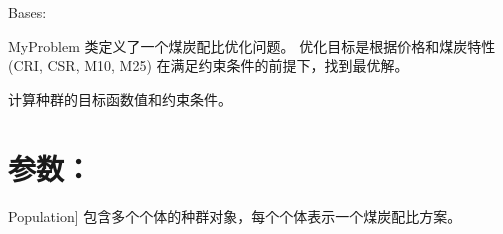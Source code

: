 \documentclass[a4paper,12pt,english]{sphinxmanual}
\begin{document}
\begin{fulllineitems}
\label{\detokenize{api/genetic_algorithm_geatpy1:genetic_algorithm_geatpy1.MyProblem}}
\pysigstartsignatures
{}
\pysigstopsignatures
\sphinxAtStartPar
Bases: 

\sphinxAtStartPar
MyProblem 类定义了一个煤炭配比优化问题。
优化目标是根据价格和煤炭特性 (CRI, CSR, M10, M25) 在满足约束条件的前提下，找到最优解。

\begin{fulllineitems}
\label{\detokenize{api/genetic_algorithm_geatpy1:genetic_algorithm_geatpy1.MyProblem.aimFunc}}
\pysigstartsignatures
{}
\pysigstopsignatures
\sphinxAtStartPar
计算种群的目标函数值和约束条件。


\section{参数：}
\label{\detokenize{api/genetic_algorithm_geatpy1:id1}}\begin{description}
\sphinxlineitem{pop}{[}Population{]}
\sphinxAtStartPar
包含多个个体的种群对象，每个个体表示一个煤炭配比方案。


\end{description}
\end{fulllineitems}
\end{fulllineitems}
\end{document}
